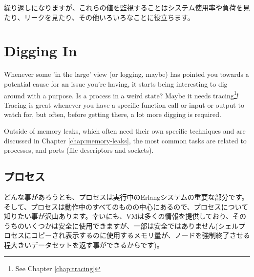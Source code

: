 繰り返しになりますが、これらの値を監視することはシステム使用率や負荷を見たり、リークを見たり、その他いろいろなことに役立ちます。

\section{Digging In}
\label{sec:digging-in}

Whenever some 'in the large' view (or logging, maybe) has pointed you towards a potential cause for an issue you're having, it starts being interesting to dig around with a purpose. Is a process in a weird state? Maybe it needs tracing\footnote{See Chapter \ref{chap:tracing}}! Tracing is great whenever you have a specific function call or input or output to watch for, but often, before getting there, a lot more digging is required.

Outside of memory leaks, which often need their own specific techniques and are discussed in Chapter \ref{chap:memory-leaks}, the most common tasks are related to processes, and ports (file descriptors and sockets).

\subsection{プロセス}
\label{subsec:digging-procs}

どんな事があろうとも、プロセスは実行中のErlangシステムの重要な部分です。そして、プロセスは動作中のすべてのものの中心にあるので、プロセスについて知りたい事が沢山あります。幸いにも、VMは多くの情報を提供しており、そのうちのいくつかは安全に使用できますが、一部は安全ではありません(シェルプロセスにコピーされ表示するのに使用するメモリ量が、ノードを強制終了させる程大きいデータセットを返す事ができるからです)。

